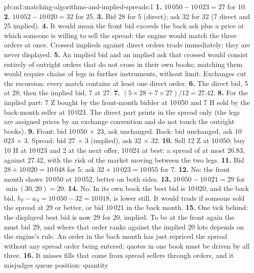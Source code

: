 \begin{solution}{pb:m1:matching-algorithms-and-implied-spreads:1}
\textbf{1.} $10\,050 - 10\,023 = 27$ for 10.
\textbf{2.} $10\,052 - 10\,020 = 32$ for 25.
\textbf{3.} Bid 28 for 5 (direct); ask 32 for 32 (7 direct and 25 implied).
\textbf{4.} It would mean the front bid exceeds the back ask plus a price
at which someone is willing to sell the spread: the engine would match the
three orders at once. Crossed implieds against direct orders trade
immediately; they are never displayed.
\textbf{5.} An implied bid and an implied ask that crossed would consist
entirely of outright orders that do not cross in their own books; matching
them would require chains of legs in further instruments, without limit.
Exchanges cut the recursion: every match contains at least one direct
order.
\textbf{6.} The direct bid, 5 at 28; then the implied bid, 7 at 27.
\textbf{7.} $(5 \times 28 + 7 \times 27)/12 = 27.42$.
\textbf{8.} For the implied part: 7 Z bought by the front-month bidder at
10\,050 and 7 H sold by the back-month seller at 10\,023. The direct part
prints in the spread only (the legs are assigned prices by an exchange
convention and do not touch the outright books).
\textbf{9.} Front: bid 10\,050 $\times$ 23, ask unchanged. Back: bid
unchanged, ask 10\,023 $\times$ 3. Spread: bid 27 $\times$ 3 (implied), ask 32
$\times$ 32.
\textbf{10.} Sell 12 Z at 10\,050; buy 10 H at 10\,023 and 2 at the next
offer, 10\,024 at best: a spread of at most 26.83, against 27.42, with the
risk of the market moving between the two legs.
\textbf{11.} Bid $28 + 10\,020 = 10\,048$ for 5; ask $32 + 10\,023 = 10\,055$ for
7.
\textbf{12.} No: the front month shows 10\,050 at 10\,052, better on both
sides.
\textbf{13.} $10\,050 - 10\,021 = 29$ for $\min(30, 20) = 20$.
\textbf{14.} No. In its own book the best bid is 10\,020, and the 
back bid, $b_F - a_S = 10\,050 - 32 = 10\,018$, is lower still. It would trade
if someone sold the spread at 29 or better, or bid 10\,021 in the back month.
\textbf{15.} One tick behind: the displayed best bid is now 29 for 20,
implied. To be at the front again the  must bid 29, and where
that order ranks against the implied 20 lots depends on the engine's rule.
An order in the back month has just repriced the spread without any spread
order being entered: quotes in one book must be driven by all three.
\textbf{16.} It misses fills that come from spread sellers through
 orders, and it misjudges queue position:  quantity

\end{solution}

